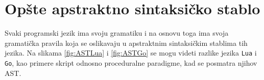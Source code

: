 \section{Opšte apstraktno sintaksičko stablo}
\label{sec:MyAST}


Svaki programski jezik ima svoju gramatiku i na osnovu toga ima svoja gramatička pravila koja se oslikavaju u apstraktnim sintaksičkim stablima tih jezika. Na slikama \ref{fig:ASTLua} i \ref{fig:ASTGo} se mogu videti razlike jezika \texttt{Lua} i \texttt{Go}, kao primere skript odnosno proceduralne paradigme, kad se posmatra njihov AST.

